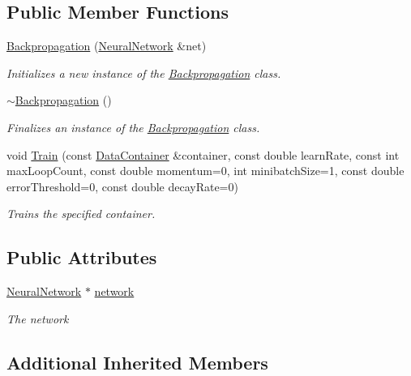 \subsection*{Public Member Functions}
\begin{DoxyCompactItemize}
\item 
\hyperlink{class_n_n_t_lib_1_1_backpropagation_afadd50e1e66fb044a6999ec5094ca1af}{Backpropagation} (\hyperlink{class_n_n_t_lib_1_1_neural_network}{Neural\+Network} \&net)
\begin{DoxyCompactList}\small\item\em Initializes a new instance of the \hyperlink{class_n_n_t_lib_1_1_backpropagation}{Backpropagation} class. \end{DoxyCompactList}\item 
\hyperlink{class_n_n_t_lib_1_1_backpropagation_a35dbdb3ee50f6edc952ee23c35d79eee}{$\sim$\+Backpropagation} ()
\begin{DoxyCompactList}\small\item\em Finalizes an instance of the \hyperlink{class_n_n_t_lib_1_1_backpropagation}{Backpropagation} class. \end{DoxyCompactList}\item 
void \hyperlink{class_n_n_t_lib_1_1_backpropagation_a1043af2261f85a391ba3baccc1bc8b4b}{Train} (const \hyperlink{class_n_n_t_lib_1_1_data_container}{Data\+Container} \&container, const double learn\+Rate, const int max\+Loop\+Count, const double momentum=0, int minibatch\+Size=1, const double error\+Threshold=0, const double decay\+Rate=0)
\begin{DoxyCompactList}\small\item\em Trains the specified container. \end{DoxyCompactList}\end{DoxyCompactItemize}
\subsection*{Public Attributes}
\begin{DoxyCompactItemize}
\item 
\hyperlink{class_n_n_t_lib_1_1_neural_network}{Neural\+Network} $\ast$ \hyperlink{class_n_n_t_lib_1_1_backpropagation_af439beac84eedecfcdd2eb0c9ff98c5a}{network}
\begin{DoxyCompactList}\small\item\em The network \end{DoxyCompactList}\end{DoxyCompactItemize}
\subsection*{Additional Inherited Members}


